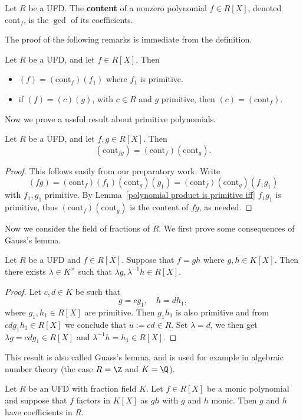 \begin{definition}
Let $R$ be a UFD. The \textbf{content} of a nonzero polynomial $f\in R[X]$, denoted $\mathrm{cont}_f$, is the $\gcd$ of its coefficients.
\end{definition}
The proof of the following remarks is immediate from the definition.
\begin{lemma}
Let $R$ be a UFD, and let $f\in R[X]$. Then
\begin{itemize}
\item $(f)=(\mathrm{cont}_f)(f_1)$ where $f_1$ is primitive.
\item if $(f)=(c)(g)$, with $c\in R$ and $g$ primitive, then $(c)=(\mathrm{cont}_f)$.
\end{itemize}
\end{lemma}
Now we prove a useful result about primitive polynomials.
\begin{proposition}
Let $R$ be a UFD, and let $f,g\in R[X]$. Then
\[(\mathrm{cont}_{fg})=(\mathrm{cont}_f)(\mathrm{cont}_g).\]
\end{proposition}
\begin{proof}
This follows easily from our preparatory work. Write
\[(fg)=(\mathrm{cont}_f)(f_1)(\mathrm{cont}_g)(g_1)=(\mathrm{cont}_f)(\mathrm{cont}_g)(f_1g_1)\]
with $f_1,g_1$ primitive. By Lemma~\ref{polynomial product is primitive iff} $f_1g_1$ is primitive, thus $(\mathrm{cont}_f)(\mathrm{cont}_g)$ is the content of $fg$, as needed.
\end{proof}
Now we consider the field of fractions of $R$. We first prove some consequences of Gauss's lemma.
\begin{proposition}\label{UFD factorization in field of fraction}
Let $R$ be a UFD and $f\in R[X]$. Suppose that $f=gh$ where $g,h\in K[X]$. Then there exists $\lambda\in K^\times$ such that $\lambda g,\lambda^{-1}h\in R[X]$.
\end{proposition}
\begin{proof}
Let $c,d\in K$ be such that
\[g=cg_1,\quad h=dh_1,\]
where $g_1,h_1\in R[X]$ are primitive. Then $g_1h_1$ is also primitive and from $cdg_1h_1\in R[X]$ we conclude that $u:=cd\in R$. Set $\lambda=d$, we then get $\lambda g=cdg_1\in R[X]$ and $\lambda^{-1}h=h_1\in R[X]$.
\end{proof}
This result is also called Guass's lemma, and is used for example in algebraic number theory (the case $R=\Z$ and $K=\Q$).
\begin{corollary}\label{UFD monic polynomial factorization in field of fraction}
Let $R$ be an UFD with fraction field $K$. Let $f\in R[X]$ be a monic polynomial and suppose that $f$ factors in $K[X]$ as $gh$ with $g$ and $h$ monic. Then $g$ and $h$ have coefficients in $R$.
\end{corollary}
